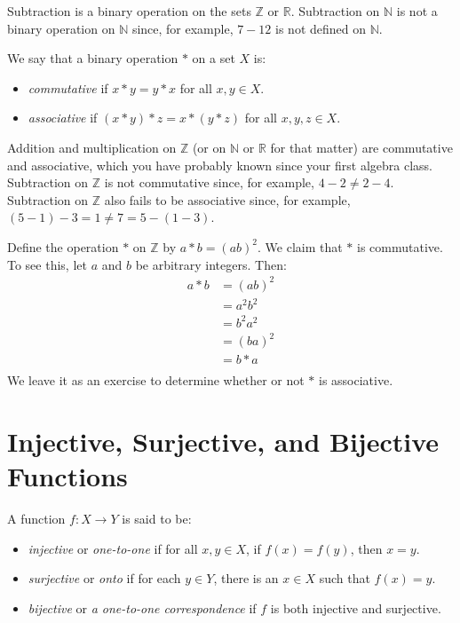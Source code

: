 \begin{example}
Subtraction is a binary operation on the sets $\mathbb Z$ or $\mathbb R$. Subtraction on $\mathbb N$ is not a binary operation on $\mathbb N$ since, for example, $7-12$ is not defined on $\mathbb N$.
\end{example}

\begin{definition}
We say that a binary operation $*$ on a set $X$ is:
\begin{itemize}
\item \emph{commutative} if $x*y=y*x$ for all $x,y\in X$.
\item \emph{associative} if $(x*y)*z= x*(y*z)$ for all $x,y,z\in X$.
\end{itemize}
\end{definition}

Addition and multiplication on $\mathbb Z$ (or on $\mathbb N$ or $\mathbb R$ for that matter) are commutative and associative, which you have probably known since your first algebra class. Subtraction on $\mathbb Z$ is not commutative since, for example, $4-2\neq 2-4$. Subtraction on $\mathbb Z$ also fails to be associative since, for example, $(5-1)-3=1\neq 7=5-(1-3)$.

\begin{example}\label{BinOps:comm}
Define the operation $*$ on $\mathbb Z$ by $a*b=(ab)^2$.  We claim that $*$ is commutative.  To see this, let $a$ and $b$ be arbitrary integers. Then:
\begin{equation*}
\begin{split}
a*b&=(ab)^2\\
&= a^2b^2\\
&=b^2a^2\\
&=(ba)^2\\
&=b*a\\
\end{split}
\end{equation*}
We leave it as an exercise to determine whether or not $*$ is
associative.
\end{example}

\section{Injective, Surjective, and Bijective Functions}
\label{sec:injsur}

\begin{definition}
A function $f:X\to Y$ is said to be:
\begin{itemize}
\item \emph{injective} or \emph{one-to-one} if for all $x,y\in X$, if $f(x)=f(y)$, then $x=y$. 
\item \emph{surjective} or \emph{onto} if for each $y\in Y$, there is an $x\in X$ such that $f(x)=y$. 
\item \emph{bijective} or \emph{a one-to-one correspondence} if $f$ is both injective and surjective. 
\end{itemize}
\end{definition}

